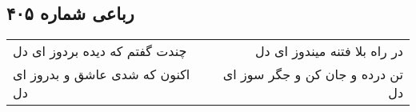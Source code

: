 \begin{center}
\section*{رباعی شماره ۴۰۵}
\label{sec:sh405}
\begin{longtable}{l p{0.5cm} r}
چندت گفتم که دیده بردوز ای دل
&&
در راه بلا فتنه میندوز ای دل
\\
اکنون که شدی عاشق و بدروز ای دل
&&
تن درده و جان کن و جگر سوز ای دل
\\
\end{longtable}
\end{center}
